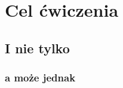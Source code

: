 \documentclass[12pt, titlepage]{article} %
\begin{document}


\section{Cel ćwiczenia}
\subsection{I nie tylko}
\subsubsection{a może jednak}



\end{document}
